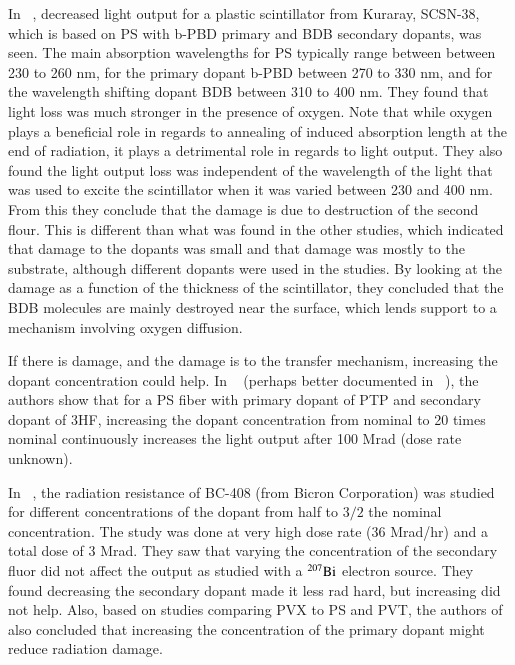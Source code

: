\documentclass[review]{elsarticle}
\begin{document}
In ~\cite{Wick1991472}, decreased light
output for a plastic scintillator from Kuraray, SCSN-38, which
is based on PS with b-PBD primary and BDB secondary dopants, was seen.
The main absorption wavelengths for PS typically range between
between 230 to 260 nm, for the primary dopant b-PBD between 270 to 330 nm,
and for the wavelength shifting dopant BDB between 310 to 400 nm.
They found that light loss was much stronger in the presence of oxygen.
Note that while oxygen plays a beneficial role in regards
to annealing of induced absorption length at the end of radiation, 
it plays a detrimental role in 
regards to light output.  
They also found the light output loss
was independent of the wavelength of the light
that was used to excite the scintillator when it
was varied between 230 and 400 nm.
From this they conclude that the damage is due to destruction
of the second flour.  This is different than what was found in
the other studies, which indicated that damage to the dopants was
small and that damage was mostly to the substrate,
although different dopants were used in the studies.
By looking at the damage as a function of the thickness of the scintillator,
they concluded that the BDB molecules are mainly destroyed
near the surface, which lends support to a mechanism involving
oxygen diffusion.


If there is damage, and the damage is to the transfer mechanism, increasing the dopant
concentration could help.
In ~\cite{zorn3} (perhaps better documented in ~\cite{sauli}), the authors show that for a PS fiber with primary dopant of PTP and secondary dopant of 3HF,
increasing the dopant concentration from nominal to 20 times nominal continuously increases the light output after 100 Mrad (dose rate unknown).

In ~\cite{Majewski1989500}, the radiation resistance of BC-408 (from Bicron Corporation) was studied for different concentrations of the dopant from half to $3/2$ the nominal concentration.  The study was done at very high dose rate (36 Mrad/hr) and a total dose of 3 Mrad.  They saw that varying the concentration of the secondary fluor did not affect the output as studied with a $\rm{^{207}Bi}$ electron source.  They found decreasing the secondary dopant made it less rad hard, but increasing did not help.  
Also, based on studies comparing PVX to PS and PVT, the authors of \cite{barashkov19961557} also concluded that
increasing the concentration of the primary dopant might reduce radiation damage.
\end{document}
